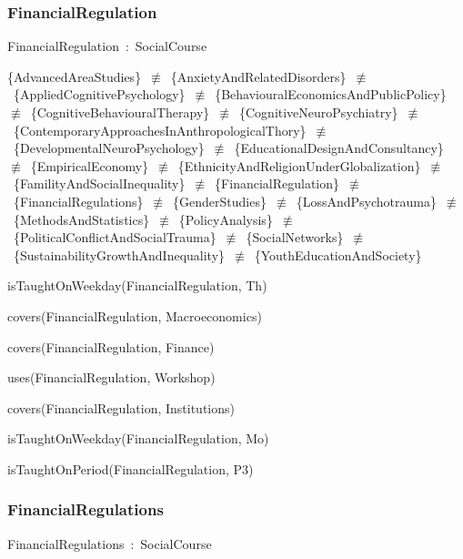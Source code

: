 \documentclass{article}
\begin{document}
\subsubsection*{FinancialRegulation}

FinancialRegulation~:~SocialCourse

\{AdvancedAreaStudies\}~\ensuremath{\not\equiv}~\{AnxietyAndRelatedDisorders\}~\ensuremath{\not\equiv}~\{AppliedCognitivePsychology\}~\ensuremath{\not\equiv}~\{BehaviouralEconomicsAndPublicPolicy\}~\ensuremath{\not\equiv}~\{CognitiveBehaviouralTherapy\}~\ensuremath{\not\equiv}~\{CognitiveNeuroPsychiatry\}~\ensuremath{\not\equiv}~\{ContemporaryApproachesInAnthropologicalThory\}~\ensuremath{\not\equiv}~\{DevelopmentalNeuroPsychology\}~\ensuremath{\not\equiv}~\{EducationalDesignAndConsultancy\}~\ensuremath{\not\equiv}~\{EmpiricalEconomy\}~\ensuremath{\not\equiv}~\{EthnicityAndReligionUnderGlobalization\}~\ensuremath{\not\equiv}~\{FamilityAndSocialInequality\}~\ensuremath{\not\equiv}~\{FinancialRegulation\}~\ensuremath{\not\equiv}~\{FinancialRegulations\}~\ensuremath{\not\equiv}~\{GenderStudies\}~\ensuremath{\not\equiv}~\{LossAndPsychotrauma\}~\ensuremath{\not\equiv}~\{MethodsAndStatistics\}~\ensuremath{\not\equiv}~\{PolicyAnalysis\}~\ensuremath{\not\equiv}~\{PoliticalConflictAndSocialTrauma\}~\ensuremath{\not\equiv}~\{SocialNetworks\}~\ensuremath{\not\equiv}~\{SustainabilityGrowthAndInequality\}~\ensuremath{\not\equiv}~\{YouthEducationAndSociety\}

isTaughtOnWeekday(FinancialRegulation, Th)

covers(FinancialRegulation, Macroeconomics)

covers(FinancialRegulation, Finance)

uses(FinancialRegulation, Workshop)

covers(FinancialRegulation, Institutions)

isTaughtOnWeekday(FinancialRegulation, Mo)

isTaughtOnPeriod(FinancialRegulation, P3)

\subsubsection*{FinancialRegulations}

FinancialRegulations~:~SocialCourse
\end{document}
